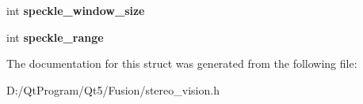 \begin{DoxyCompactItemize}
\item 
\hypertarget{structstereo__vision_1_1match_param_b_m_a6661183f9b84d368b6f3b4f519499390}{}int {\bfseries speckle\+\_\+window\+\_\+size}\label{structstereo__vision_1_1match_param_b_m_a6661183f9b84d368b6f3b4f519499390}

\item 
\hypertarget{structstereo__vision_1_1match_param_b_m_a1084d18009372551eca3946d819b43f2}{}int {\bfseries speckle\+\_\+range}\label{structstereo__vision_1_1match_param_b_m_a1084d18009372551eca3946d819b43f2}

\end{DoxyCompactItemize}


The documentation for this struct was generated from the following file\+:\begin{DoxyCompactItemize}
\item 
D\+:/\+Qt\+Program/\+Qt5/\+Fusion/stereo\+\_\+vision.\+h\end{DoxyCompactItemize}
